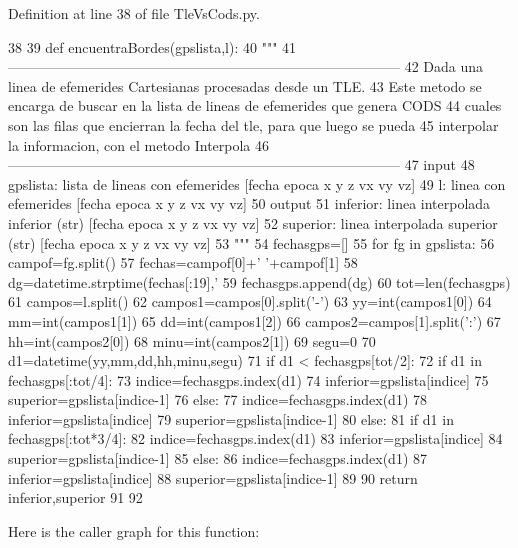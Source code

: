 \-Definition at line 38 of file \-Tle\-Vs\-Cods.\-py.


\begin{DoxyCode}
38 
39 def encuentraBordes(gpslista,l):
40     """
41    
       ------------------------------------------------------------------------------------
42     Dada una linea de efemerides Cartesianas procesadas desde un TLE. 
43     Este metodo se encarga de buscar en la lista de lineas de efemerides que
       genera CODS
44     cuales son las filas que encierran  la fecha del tle, para que luego se
       pueda
45     interpolar la informacion, con el metodo Interpola
46    
       ------------------------------------------------------------------------------------
47     input
48         gpslista: lista de lineas con efemerides [fecha epoca x y z vx vy vz]
49         l: linea con efemerides [fecha epoca x y z vx vy vz]
50     output
51         inferior: linea interpolada inferior (str) [fecha epoca x y z vx vy vz]
52         superior: linea interpolada superior (str) [fecha epoca x y z vx vy vz]
53     """
54     fechasgps=[]
55     for fg in gpslista:
56         campof=fg.split()
57         fechas=campof[0]+' '+campof[1]
58         dg=datetime.strptime(fechas[:19],'%
59         fechasgps.append(dg)
60     tot=len(fechasgps)
61     campos=l.split()
62     campos1=campos[0].split('-')
63     yy=int(campos1[0])
64     mm=int(campos1[1])
65     dd=int(campos1[2])
66     campos2=campos[1].split(':')
67     hh=int(campos2[0])
68     minu=int(campos2[1])
69     segu=0
70     d1=datetime(yy,mm,dd,hh,minu,segu)      
71     if d1 < fechasgps[tot/2]:
72         if d1 in fechasgps[:tot/4]:
73             indice=fechasgps.index(d1)
74             inferior=gpslista[indice]
75             superior=gpslista[indice-1]
76         else:
77             indice=fechasgps.index(d1)
78             inferior=gpslista[indice]
79             superior=gpslista[indice-1]
80     else:
81         if d1 in fechasgps[:tot*3/4]:
82             indice=fechasgps.index(d1)
83             inferior=gpslista[indice]
84             superior=gpslista[indice-1]
85         else:
86             indice=fechasgps.index(d1)
87             inferior=gpslista[indice]
88             superior=gpslista[indice-1]
89                 
90     return inferior,superior
91              
92 

\end{DoxyCode}


\-Here is the caller graph for this function\-:


